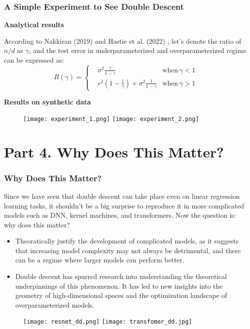 \documentclass{beamer}
\begin{document}
	\begin{frame}[t]
		\frametitle{A Simple Experiment to See Double Descent}
		\scriptsize
		\textbf{\small Analytical results}
		
		\vspace{1mm}
		According to Nakkiran (2019) \cite{nakkiran2019more} and Hastie et al. (2022) \cite{hastie2022surprises}, let's denote the ratio of $n/d$ as $\gamma$, and the test error in underparameterized and overparameterized regime can be expressed as:
		\begin{equation}
			R(\gamma) = \left\{
			\begin{aligned}
				& \sigma^2\frac{\gamma}{1-\gamma} & \text{when} \ \gamma < 1\\
				& r^2(1-\frac{1}{\gamma}) + \sigma^2\frac{1}{1-\gamma} & \text{when} \ \gamma > 1
			\end{aligned}
			\right.
			\label{eq:5}
		\end{equation}
		
		\textbf{\small Results on synthetic data}
		\begin{figure}[H]
			\centering
			\subfloat
			{{\texttt{[image: experiment\_1.png]} }}%
			\qquad
			\subfloat
			{{\texttt{[image: experiment\_2.png]} }}%
			\label{fig:4}
		\end{figure}
	\end{frame}

	\section{Part 4. Why Does This Matter?}
	\begin{frame}[t]
		\frametitle{Why Does This Matter?}
		\scriptsize
		Since we have seen that double descent can take place even on linear regression learning tasks, it shouldn't be a big surprise to reproduce it in more complicated models such as DNN, kernel machines, and transformers. Now the question is: why does this matter? \\
		
		\vspace{1mm}
		\begin{itemize}
			\justifying
			\item Theoratically justify the development of complicated models, as it suggests that increasing model complexity may not always be detrimental, and there can be a regime where larger models can perform better.
			\item Double descent has spurred research into understanding the theoretical underpinnings of this phenomenon. It has led to new insights into the geometry of high-dimensional spaces and the optimization landscape of overparameterized models.
		\end{itemize}
	
		\begin{figure}[H]
			\centering
			\subfloat
			{{\texttt{[image: resnet\_dd.png]} }}%
			\qquad
			\subfloat
			{{\texttt{[image: transfomer\_dd.jpg]} }}%
			\label{fig:5}
		\end{figure}
	\end{frame}
	
\end{document}
